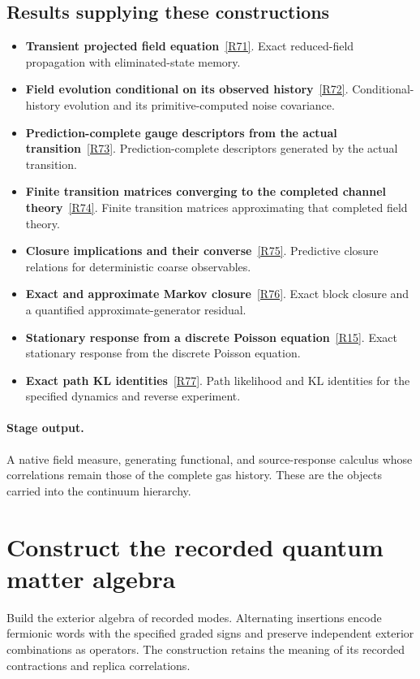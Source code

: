 \documentclass[11pt,a4paper]{article}
\begin{document}
\subsection*{Results supplying these constructions}
\begin{itemize}
\item \textbf{Transient projected field equation}~\hyperref[src:thm-algorithmic-transient-field-memory]{[R71]}. Exact reduced-field propagation with eliminated-state memory.
\item \textbf{Field evolution conditional on its observed history}~\hyperref[src:thm-algorithmic-field-filter]{[R72]}. Conditional-history evolution and its primitive-computed noise covariance.
\item \textbf{Prediction-complete gauge descriptors from the actual transition}~\hyperref[src:thm-sm-prediction-complete-descriptors]{[R73]}. Prediction-complete descriptors generated by the actual transition.
\item \textbf{Finite transition matrices converging to the completed channel theory}~\hyperref[src:thm-sm-predictive-partition-convergence]{[R74]}. Finite transition matrices approximating that completed field theory.
\item \textbf{Closure implications and their converse}~\hyperref[src:thm-closure-equivalence-cosmo]{[R75]}. Predictive closure relations for deterministic coarse observables.
\item \textbf{Exact and approximate Markov closure}~\hyperref[src:prop-cosmo-generator-closure]{[R76]}. Exact block closure and a quantified approximate-generator residual.
\item \textbf{Stationary response from a discrete Poisson equation}~\hyperref[src:thm-algorithmic-stationary-response]{[R15]}. Exact stationary response from the discrete Poisson equation.
\item \textbf{Exact path KL identities}~\hyperref[src:prop-algorithmic-path-kl-identities]{[R77]}. Path likelihood and KL identities for the specified dynamics and reverse experiment.
\end{itemize}
\paragraph{Stage output.} A native field measure, generating functional, and source-response calculus whose correlations remain those of the complete gas history. These are the objects carried into the continuum hierarchy.

\section{Construct the recorded quantum matter algebra}
\label{stage:13}
Build the exterior algebra of recorded modes. Alternating insertions encode fermionic words with the specified graded signs and preserve independent exterior combinations as operators. The construction retains the meaning of its recorded contractions and replica correlations.
\end{document}
